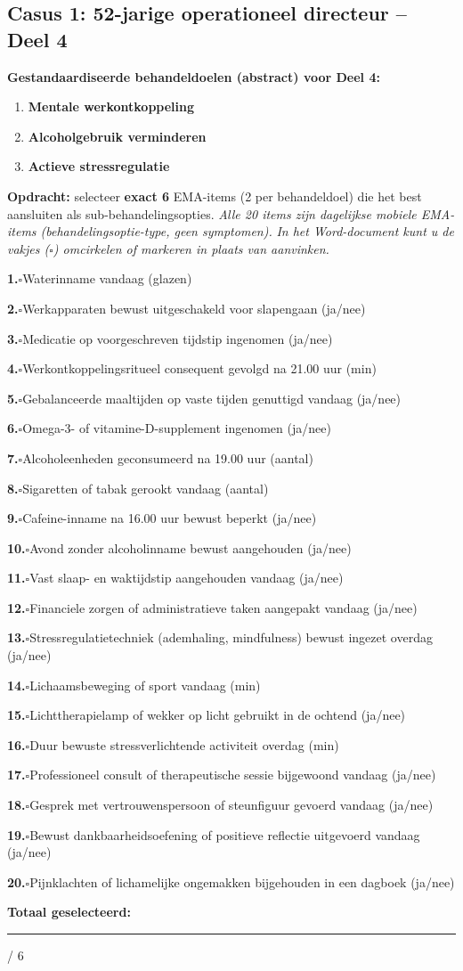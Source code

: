 \documentclass[11pt,a4paper]{article}
\newcommand{\checkitemBFS}[2]{%
\noindent\small\textbf{#1.}\hspace{0.45em}$\square$\hspace{0.4em}#2\par\vspace{0.20em}}
\begin{document}
\newpage
\subsection*{Casus 1: 52-jarige operationeel directeur -- Deel 4}

\begin{contextbox}
\small\textbf{Gestandaardiseerde behandeldoelen (abstract) voor Deel 4:}
\begin{enumerate}[topsep=2pt,itemsep=1pt,label=\arabic*.]
\item \textbf{Mentale werkontkoppeling}
\item \textbf{Alcoholgebruik verminderen}
\item \textbf{Actieve stressregulatie}
\end{enumerate}
\end{contextbox}

\begin{responsebox}[title={Uw antwoord -- Deel 4}]
\small\textbf{Opdracht:} selecteer \textbf{exact 6} EMA-items (2 per behandeldoel) die het best aansluiten als sub-behandelingsopties.
\textit{Alle 20 items zijn dagelijkse mobiele EMA-items (behandelingsoptie-type, geen symptomen).}
\textit{In het Word-document kunt u de vakjes ($\square$) omcirkelen of markeren in plaats van aanvinken.}

\checkitemBFS{1}{Waterinname vandaag (glazen)}
\checkitemBFS{2}{Werkapparaten bewust uitgeschakeld voor slapengaan (ja/nee)}
\checkitemBFS{3}{Medicatie op voorgeschreven tijdstip ingenomen (ja/nee)}
\checkitemBFS{4}{Werkontkoppelingsritueel consequent gevolgd na 21.00 uur (min)}
\checkitemBFS{5}{Gebalanceerde maaltijden op vaste tijden genuttigd vandaag (ja/nee)}
\checkitemBFS{6}{Omega-3- of vitamine-D-supplement ingenomen (ja/nee)}
\checkitemBFS{7}{Alcoholeenheden geconsumeerd na 19.00 uur (aantal)}
\checkitemBFS{8}{Sigaretten of tabak gerookt vandaag (aantal)}
\checkitemBFS{9}{Cafeine-inname na 16.00 uur bewust beperkt (ja/nee)}
\checkitemBFS{10}{Avond zonder alcoholinname bewust aangehouden (ja/nee)}
\checkitemBFS{11}{Vast slaap- en waktijdstip aangehouden vandaag (ja/nee)}
\checkitemBFS{12}{Financiele zorgen of administratieve taken aangepakt vandaag (ja/nee)}
\checkitemBFS{13}{Stressregulatietechniek (ademhaling, mindfulness) bewust ingezet overdag (ja/nee)}
\checkitemBFS{14}{Lichaamsbeweging of sport vandaag (min)}
\checkitemBFS{15}{Lichttherapielamp of wekker op licht gebruikt in de ochtend (ja/nee)}
\checkitemBFS{16}{Duur bewuste stressverlichtende activiteit overdag (min)}
\checkitemBFS{17}{Professioneel consult of therapeutische sessie bijgewoond vandaag (ja/nee)}
\checkitemBFS{18}{Gesprek met vertrouwenspersoon of steunfiguur gevoerd vandaag (ja/nee)}
\checkitemBFS{19}{Bewust dankbaarheidsoefening of positieve reflectie uitgevoerd vandaag (ja/nee)}
\checkitemBFS{20}{Pijnklachten of lichamelijke ongemakken bijgehouden in een dagboek (ja/nee)}
\vspace{0.4em}
\noindent\textbf{Totaal geselecteerd:}\hspace{0.5em}\rule{1.2cm}{0.25pt}\hspace{0.2em}/ 6
\end{responsebox}
\end{document}
